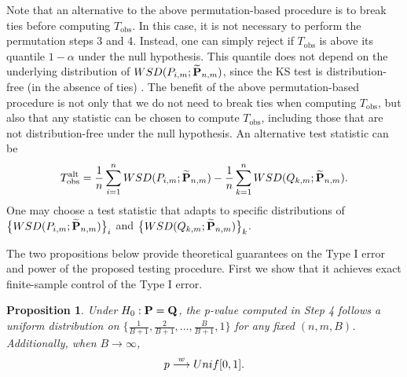 \documentclass{imsart}
\newtheorem {Proposition}{Proposition}[section]
\numberwithin{equation}{section}
\begin{document}
Note that an alternative to the above permutation-based procedure is to break ties before computing $T_{
	\text{obs}}$. In this case, it is not necessary to perform the permutation steps 3 and 4. Instead, one can simply reject if $T_{
	\text{obs}}$ is above its quantile $1 - \alpha$ under the null hypothesis. This quantile does not depend on the underlying distribution of $\rm{WSD}(P_{i,m}; \widetilde{\mathbf{P}}_{n,m})$, since the KS test is distribution-free (in the absence of ties) \citep{massey1951distribution}. The benefit of the above permutation-based procedure is
not only that we do not need to break ties when computing $T_{
	\text{obs}}$, but also that 
any statistic can be chosen to compute $T_{\text{obs}}$, including those that are not distribution-free under the null hypothesis.
An alternative test statistic can be
\begin{equation*}
	T^{\text{alt}}_{\text{obs}} = \frac{1}{n}\sum_{i=1}^n \rm{WSD}(P_{i,m}; \widetilde{\mathbf{P}}_{n,m}) - \frac{1}{n}\sum_{k=1}^n \rm{WSD}(Q_{k,m}; \widetilde{\mathbf{P}}_{n,m}).
\end{equation*}
One may choose a test statistic that adapts to specific distributions of $\big\{ \rm{WSD}(P_{i,m}; \widetilde{\mathbf{P}}_{n,m}) \big\}_i$ and $\big\{ \rm{WSD}(Q_{k,m}; \widetilde{\mathbf{P}}_{n,m}) \big\}_k$.




The two propositions below provide theoretical guarantees on the Type I error and power of the proposed testing procedure. First we show that it achieves exact finite-sample control of the Type I error.




\begin{Proposition}
	Under $H_0:{\bf P}={\bf Q}$, the p-value computed in Step 4  follows a uniform distribution on $\{ \frac{1}{B+1}, \frac{2}{B+1}, \ldots, \frac{B}{B+1}, 1 \}$ for any fixed $(n, m, B)$. 
	Additionally, when $B\rightarrow \infty$, 
	\begin{equation*}
		p \stackrel{w}{\longrightarrow} \rm{Unif}[0, 1].
	\end{equation*} 
	\label{prop:level:two:sample}
\end{Proposition}
\end{document}
